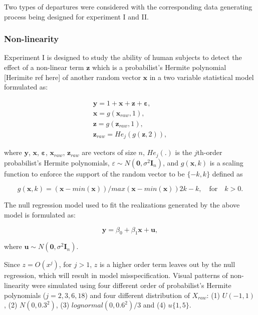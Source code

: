 \documentclass[]{interact}
\theoremstyle{plain}%
\theoremstyle{definition}
\theoremstyle{remark}
\begin{document}
Two types of departures were considered with the corresponding data
generating process being designed for experiment I and II.

\hypertarget{non-linearity}{%
\subsubsection{Non-linearity}\label{non-linearity}}

Experiment I is designed to study the ability of human subjects to
detect the effect of a non-linear term \(\boldsymbol{z}\) which is a
probabilist's Hermite polynomial {[}Herimite ref here{]} of another
random vector \(\boldsymbol{x}\) in a two variable statistical model
formulated as:

\begin{align} \label{eq:nonlinearity-model}
\boldsymbol{y} = 1 + \boldsymbol{x} + \boldsymbol{z} + \boldsymbol{\varepsilon},\\
\boldsymbol{x} = g(\boldsymbol{x}_{raw}, 1), \\
\boldsymbol{z} = g(\boldsymbol{z}_{raw}, 1), \\
\boldsymbol{z}_{raw} = He_j(g(\boldsymbol{z}, 2)),
\end{align}

where \(\boldsymbol{y}\), \(\boldsymbol{x}\),
\(\boldsymbol{\varepsilon}\), \(\boldsymbol{x}_{raw}\),
\(\boldsymbol{z}_{raw}\) are vectors of size \(n\), \(He_{j}(.)\) is the
\(j\)th-order probabilist's Hermite polynomials,
\(\varepsilon \sim N(\boldsymbol{0}, \sigma^2\boldsymbol{I}_n)\), and
\(g(\boldsymbol{x}, k)\) is a scaling function to enforce the support of
the random vector to be \(\{-k, k\}\) defined as

\begin{equation} \label{eq:scaling-function}
g(\boldsymbol{x}, k) = (\boldsymbol{x} - min(\boldsymbol{x}))/max(\boldsymbol{x} - min(\boldsymbol{x}))2k - k, \quad \text{for} \quad k > 0. 
\end{equation}

The null regression model used to fit the realizations generated by the
above model is formulated as:

\begin{equation} \label{eq:null-model}
\boldsymbol{y} = \beta_0 + \beta_1 \boldsymbol{x} + \boldsymbol{u},
\end{equation}

where
\(\boldsymbol{u} \sim N(\boldsymbol{0}, \sigma^2\boldsymbol{I}_n)\).

Since \(z = O(x^j)\), for \(j > 1\), \(z\) is a higher order term leaves
out by the null regression, which will result in model misspecification.
Visual patterns of non-linearity were simulated using four different
order of probabilist's Hermite polynomials (\(j = 2, 3, 6, 18\)) and
four different distribution of \(X_{raw}\): (1) \(U(-1, 1)\), (2)
\(N(0, 0.3^2)\), (3) \(lognormal(0, 0.6^2)/3\) and (4) \(u\{1, 5\}\).
\end{document}
